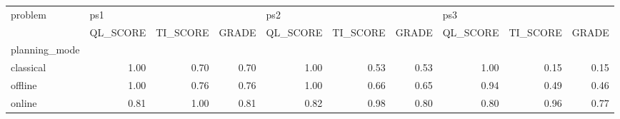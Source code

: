 \begin{tabular}{lrrrrrrrrr}
\toprule
problem & \multicolumn{3}{l}{ps1} & \multicolumn{3}{l}{ps2} & \multicolumn{3}{l}{ps3} \\
{} & QL\_SCORE & TI\_SCORE & GRADE & QL\_SCORE & TI\_SCORE & GRADE & QL\_SCORE & TI\_SCORE & GRADE \\
planning\_mode &          &          &       &          &          &       &          &          &       \\
\midrule
classical     &     1.00 &     0.70 &  0.70 &     1.00 &     0.53 &  0.53 &     1.00 &     0.15 &  0.15 \\
offline       &     1.00 &     0.76 &  0.76 &     1.00 &     0.66 &  0.65 &     0.94 &     0.49 &  0.46 \\
online        &     0.81 &     1.00 &  0.81 &     0.82 &     0.98 &  0.80 &     0.80 &     0.96 &  0.77 \\
\bottomrule
\end{tabular}
